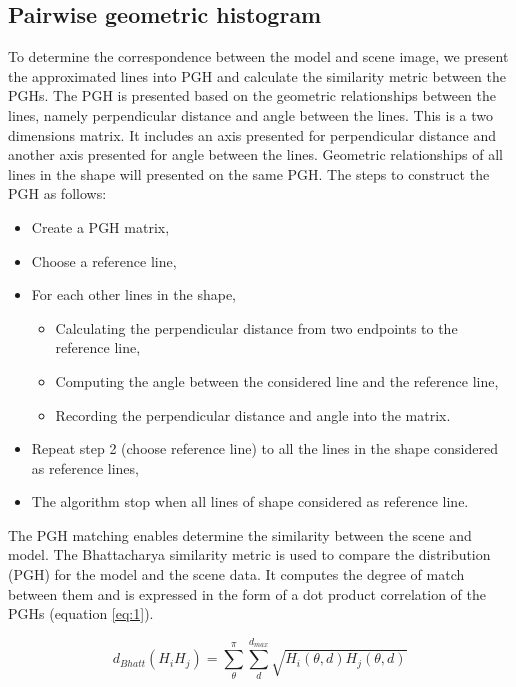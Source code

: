 \documentclass[11pt, twocolumn, a4paper]{article}
\begin{document}
\subsection{Pairwise geometric histogram}
To determine the correspondence between the model and scene image, we present the approximated lines into PGH\cite{evans1993use} and calculate the similarity metric between the PGHs. The PGH is presented based on the geometric relationships between the lines, namely perpendicular distance and angle between the lines. This is a two dimensions matrix. It includes an axis presented for perpendicular distance and another axis presented for angle between the lines. Geometric relationships of all lines in the shape will presented on the same PGH. The steps to construct the PGH as follows:
\begin{itemize}
\item Create a PGH matrix,
\item Choose a reference line,
\item For each other lines in the shape,
	\begin{itemize}
		\item Calculating the perpendicular distance from two endpoints to the reference line,
		\item Computing the angle between the considered line and the reference line,
		\item Recording the perpendicular distance and angle into the matrix.
	\end{itemize}
\item Repeat step 2 (choose reference line) to all the lines in the shape considered as reference lines,
\item The algorithm stop when all lines of shape considered as reference line.
\end{itemize}
The PGH matching enables determine the similarity between the scene and model. The Bhattacharya\cite{palaniswamy2010automatic} similarity metric is used to compare the distribution (PGH) for the model and the scene data. It computes the degree of match between them and is expressed in the form of a dot product correlation of the PGHs (equation \ref{eq:1}).
\begin{center}
\begin{equation} \label{eq:1}
d_{Bhatt} (H_{i}H_{j}) = \sum\limits_{\theta}^{\pi}\sum\limits_{d}^{d_{max}}\sqrt{H_{i}(\theta,d)H_{j}(\theta,d)}
\end{equation}
\end{center}
\end{document}

